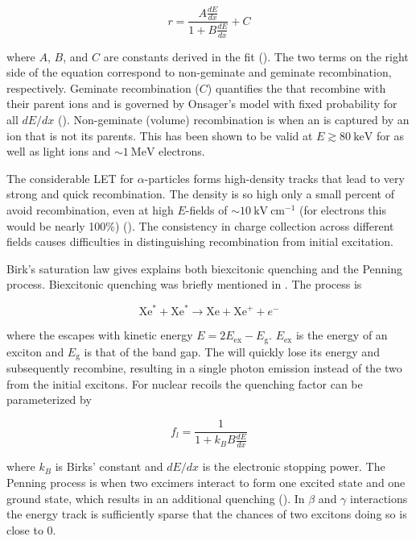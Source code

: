 \begin{equation}
r = \frac{A \frac{dE}{dx}}{1 + B \frac{dE}{dx}} + C
\label{eq:birks_recomb}
\end{equation}

\noindent where $A$, $B$, and $C$ are constants derived in the fit ().  The two terms on the right side of the equation
correspond to
non-geminate and geminate recombination, respectively.  Geminate recombination ($C$) quantifies the
\electron that recombine with their parent ions and is governed by Onsager's model with fixed probability for all $dE/dx$
().  Non-geminate
(volume) recombination is when an \electron is captured by an ion that is not its parents.  This has been shown to be valid at
$E \gtrsim 80\ \mathrm{keV}$ for \gammarays as well as light ions and $\sim 1\ \mathrm{MeV}$ electrons.

The considerable LET for $\alpha$-particles forms high-density tracks that lead to very strong and quick recombination.  The
density is so high only a small percent of \electron avoid recombination, even at high $E$-fields of $\sim 10\ \mathrm{kV\ cm^{-1}}$
(for electrons this would be nearly 100\%) ().  The consistency in charge collection across different fields causes
difficulties in distinguishing recombination from initial excitation.

Birk's saturation law gives explains both biexcitonic quenching and the Penning process.  Biexcitonic quenching was briefly mentioned in
.  The process is

\begin{equation}
\mathrm{Xe}^{*} + \mathrm{Xe}^{*} \rightarrow \mathrm{Xe} + \mathrm{Xe}^{+} + e^{-}
\label{eq:biexcitonic_again}
\end{equation}

\noindent where the \electron escapes with kinetic energy $E = 2E_{\mathrm{ex}} - E_{\mathrm{g}}$.  $E_{\mathrm{ex}}$ is the energy
of an exciton and $E_{\mathrm{g}}$ is that of the band gap.  The \electron will quickly lose its energy and subsequently recombine,
resulting in a single photon emission instead of the two from the initial excitons.  For nuclear recoils the quenching factor can
be parameterized by

\begin{equation}
f_{l} = \frac{1}{1 + k_B B \frac{dE}{dx}}
\label{eq:nr_scint_quench}
\end{equation}

\noindent where $k_B$ is Birks' constant and $dE/dx$ is the electronic stopping power.  The Penning process is when two excimers interact
to form one excited
state and one ground state, which results in an additional quenching ().  In $\beta$ and $\gamma$ interactions the energy
track is sufficiently sparse that the chances of two excitons doing so is close to 0.


